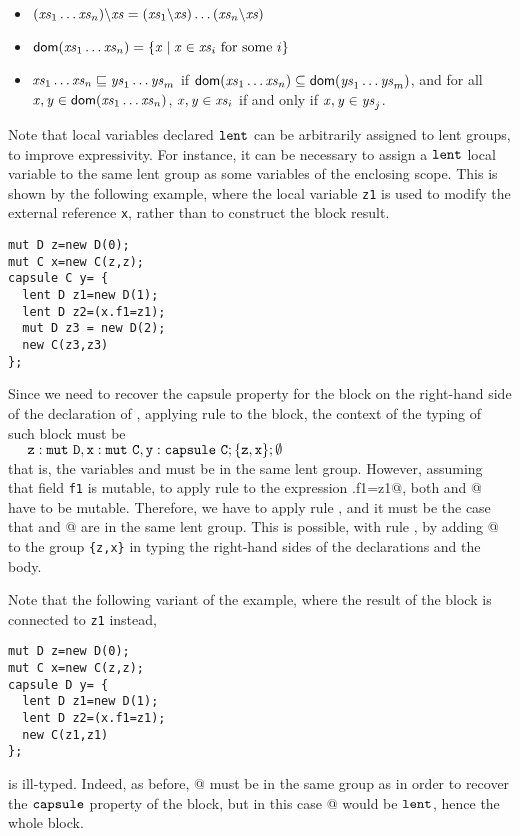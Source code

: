 {{\begin{itemize}
\item $(\mathit{xs}_1\ldots\mathit{xs}_n){\setminus}\mathit{xs}=(\mathit{xs}_1{\setminus}\mathit{xs})\ldots(\mathit{xs}_n{\setminus}\mathit{xs})$  
\item $\textsf{dom}(\mathit{xs}_1\ldots\mathit{xs}_n)=\{\mathit{x}\mid \mathit{x}\in\mathit{xs}_i\mbox{ for some}\ i\}$
\item $\mathit{xs}_1\ldots\mathit{xs}_n\sqsubseteq\mathit{ys}_1\ldots\mathit{ys}_m$ if $\textsf{dom}(\mathit{xs}_1\ldots\mathit{xs}_n)\subseteq\textsf{dom}(\mathit{ys}_1\ldots\mathit{ys}_m)$, and {for all $\mathit{x},\mathit{y}\in\textsf{dom}(\mathit{xs}_1\ldots\mathit{xs}_n)$, $\mathit{x},\mathit{y}\in\mathit{xs}_i$ if and only if 
$\mathit{x},\mathit{y}\in\mathit{ys}_j$.}
\end{itemize} }

{Note that local variables declared $\texttt{lent}$ can be arbitrarily assigned to {lent group}s, to improve expressivity. For instance, it can be necessary to assign a $\texttt{lent}$ local variable to the same {lent group} {as} some variables of the enclosing scope. This is shown by the following example, where the local variable \lstinline{z1} is used to modify the external reference \lstinline{x}, rather than to construct the block result.}
\begin{lstlisting}
mut D z=new D(0);  
mut C x=new C(z,z);
capsule C y= {
  lent D z1=new D(1); 
  lent D z2=(x.f1=z1);  
  mut D z3 = new D(2);
  new C(z3,z3)
};
\end{lstlisting}
Since 
we need to {recover the capsule property for} the
block on the right-hand side of the declaration of \Q@y@, applying rule  to the block, the context of the typing of such block 
must be \\
{\small $\ \ \ \ {\tt z:\mutable\ D,x:\mutable\ C,y:\capsule\ C; {\{z, x\}}; \emptyset}$}\\
that is, the variables
\Q@z@ and \Q@x@ must be in the same {lent group}. However, assuming that field \lstinline{f1}{} is mutable, to apply rule  to the expression \Q@x.f1=z1@,  both \Q@x@ and @ have to be mutable. Therefore, we have to apply rule
, and it must be the case that  \Q@x@ and @ are in the same {lent group}. This is possible, with rule , by adding @ to the group \verb!{z,x}! in typing the right-hand sides of the declarations and the body.

Note that the following variant of the example, where the result of the block is connected to \lstinline{z1} instead,}
\begin{lstlisting}
mut D z=new D(0);  
mut C x=new C(z,z);
capsule D y= {
  lent D z1=new D(1); 
  lent D z2=(x.f1=z1);  
  new C(z1,z1)
};
\end{lstlisting}
is ill-typed.  Indeed, as before, @ must be in the same group {as} \Q@x@ in order to {recover the $\texttt{capsule}$ property of} the block, but in this case @ would be $\texttt{lent}$, hence the whole block.

